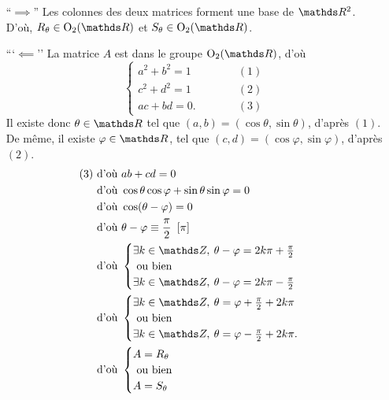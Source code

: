 \begin{prv}
	\begin{itemize}
		\item[``$\implies$''] Les colonnes des deux matrices forment une base de $\R^2$. D'où, $R_\theta \in \mathrm{O}_2(\R)$\/ et $S_\theta  \in \mathrm{O}_2(\R)$.
		\item[```$\impliedby$'']
			La matrice $A$\/ est dans le groupe $\mathrm{O}_2(\R)$, d'où \[
				\begin{cases}
					a^2 + b^2 = 1 \quad\quad\quad&(1)\\
					c^2 + d^2 = 1 \quad\quad\quad&(2)\\
					ac + bd = 0. \quad\quad\quad& (3)
				\end{cases}
			\] Il existe donc $\theta \in \R$\/ tel que $(a,b) = (\cos \theta, \sin \theta)$, d'après $(1)$.
			De même, il existe $\varphi \in \R$, tel que $(c,d) = (\cos \varphi, \sin \varphi)$, d'après $(2)$.
			\begin{align*}
				(3) & \text{ d'où } ab + cd = 0\\
						& \text{ d'où } \cos\theta\cos\varphi + \sin\theta\sin\varphi = 0\\
						& \text{ d'où } \cos (\theta - \varphi) = 0\\
						& \text{ d'où } \theta - \varphi \equiv \frac{\pi}{2}\mod \pi\\
						& \text{ d'où } \begin{cases}
							\exists k \in \Z,\: \theta - \varphi =2 k \pi + \frac{\pi}{2}\\
							\text{ ou bien }\\
							\exists k \in \Z,\: \theta- \varphi = 2k\pi - \frac{\pi}{2}\\
						\end{cases}\\
						& \text{ d'où } \begin{cases}
							\exists k \in \Z,\: \theta = \varphi + \frac{\pi}{2} + 2k\pi\\
							\text{ ou bien }\\
							\exists k \in \Z,\: \theta = \varphi - \frac{\pi}{2} + 2k\pi.\\
						\end{cases}\\
						& \text{ d'où } \begin{cases}
							A = R_\theta\\
							\text{ ou bien }\\
							A = S_\theta
						\end{cases}
			\end{align*}
	\end{itemize}
\end{prv}

